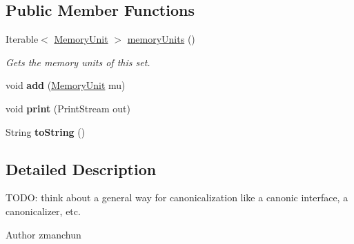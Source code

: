 \subsection*{Public Member Functions}
\begin{DoxyCompactItemize}
\item 
Iterable$<$ \hyperlink{interfaceedu_1_1udel_1_1cis_1_1vsl_1_1civl_1_1state_1_1IF_1_1MemoryUnit}{Memory\+Unit} $>$ \hyperlink{classedu_1_1udel_1_1cis_1_1vsl_1_1civl_1_1state_1_1common_1_1immutable_1_1ImmutableMemoryUnitSet_a11a3e4049e89ddde70f6dc9608e88b4d}{memory\+Units} ()
\begin{DoxyCompactList}\small\item\em Gets the memory units of this set. \end{DoxyCompactList}\item 
\hypertarget{classedu_1_1udel_1_1cis_1_1vsl_1_1civl_1_1state_1_1common_1_1immutable_1_1ImmutableMemoryUnitSet_a1f0e3089a32148df8f718800243978f6}{}void {\bfseries add} (\hyperlink{interfaceedu_1_1udel_1_1cis_1_1vsl_1_1civl_1_1state_1_1IF_1_1MemoryUnit}{Memory\+Unit} mu)\label{classedu_1_1udel_1_1cis_1_1vsl_1_1civl_1_1state_1_1common_1_1immutable_1_1ImmutableMemoryUnitSet_a1f0e3089a32148df8f718800243978f6}

\item 
\hypertarget{classedu_1_1udel_1_1cis_1_1vsl_1_1civl_1_1state_1_1common_1_1immutable_1_1ImmutableMemoryUnitSet_a119ed9af34990a98ac1884947511f0c5}{}void {\bfseries print} (Print\+Stream out)\label{classedu_1_1udel_1_1cis_1_1vsl_1_1civl_1_1state_1_1common_1_1immutable_1_1ImmutableMemoryUnitSet_a119ed9af34990a98ac1884947511f0c5}

\item 
\hypertarget{classedu_1_1udel_1_1cis_1_1vsl_1_1civl_1_1state_1_1common_1_1immutable_1_1ImmutableMemoryUnitSet_a5ce84135f4bd446548484c113f0a508b}{}String {\bfseries to\+String} ()\label{classedu_1_1udel_1_1cis_1_1vsl_1_1civl_1_1state_1_1common_1_1immutable_1_1ImmutableMemoryUnitSet_a5ce84135f4bd446548484c113f0a508b}

\end{DoxyCompactItemize}


\subsection{Detailed Description}
T\+O\+D\+O\+: think about a general way for canonicalization like a canonic interface, a canonicalizer, etc. 

\begin{DoxyAuthor}{Author}
zmanchun 
\end{DoxyAuthor}


